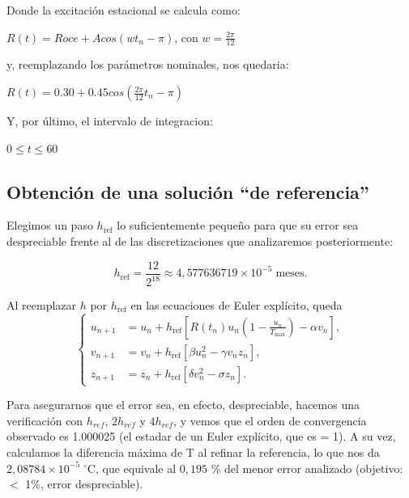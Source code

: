 Donde la excitación estacional se calcula como:

\begin{center}

$R(t) = Roce + A cos(w t_n - \pi)$, con $w = \frac{2 \pi}{12} $

\end{center}

y, reemplazando los parámetros nominales, nos quedaria:

\begin{center}

$R(t) = 0.30 + 0.45 cos(\frac{2 \pi}{12} t_n - \pi)$

\end{center}

Y, por último, el intervalo de integracion:

\begin{center}

$0 \le t \le 60$

\end{center}

\subsection{Obtención de una solución “de referencia”}

Elegimos un paso $h_{\mathrm{ref}}$ lo suficientemente pequeño para que
su error sea despreciable frente al de las discretizaciones que
analizaremos posteriormente:

\begin{equation}
    \boxed{h_{\mathrm{ref}}=\frac{12}{2^{18}}\approx
    4{,}577636719\times10^{-5}\;\mathrm{meses}}.
\end{equation}

Al reemplazar $h$ por $h_{\mathrm{ref}}$ en las ecuaciones de Euler explícito, queda
\[
\left\{
\begin{aligned}
    u_{n+1} &= u_n+h_{\mathrm{ref}}\left[R(t_n)u_n\left(1-\frac{u_n}{T_{\max}}\right)-\alpha v_n\right],\\
    v_{n+1} &= v_n+h_{\mathrm{ref}}\left[\beta u_n^2-\gamma v_nz_n\right],\\
    z_{n+1} &= z_n+h_{\mathrm{ref}}\left[\delta v_n^2-\sigma z_n\right].
\end{aligned}
\right.
\]

Para asegurarnos que el error sea, en efecto, despreciable, hacemos una verificación con $h_{ref}$, $2h_{ref}$ y $4h_{ref}$, y vemos que el orden de convergencia observado es 1.000025 (el estadar de un Euler explícito, que es = 1). A su vez, calculamos la diferencia máxima de T al refinar la referencia, lo que nos da $2{,}08784\times10^{-5}\;{}^\circ\mathrm{C}$, que equivale al $0{,}195$ \% del menor error analizado (objetivo: $<$ 1\%, error despreciable).


